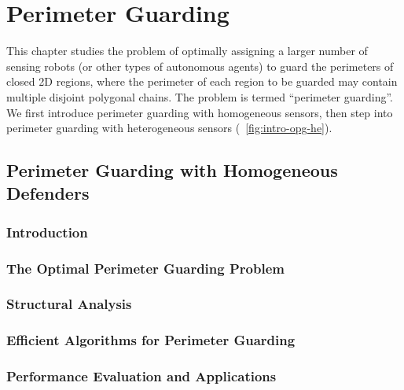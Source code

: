 
\chapter{Perimeter Guarding}
\thispagestyle{myheadings}

This chapter studies the problem of optimally assigning a larger number of sensing
robots (or other types of autonomous agents) to guard the perimeters of closed 2D regions,
where the perimeter of each region to be guarded may contain multiple disjoint polygonal chains.
The problem is termed ``perimeter guarding''.
We first introduce perimeter guarding with homogeneous sensors,
then step into perimeter guarding with heterogeneous sensors (~\ref{fig:intro-opg-he}). 

\section{Perimeter Guarding with Homogeneous Defenders}

\def\R{\mathcal R}
\def\C{\mathcal C}
\def\S{\mathcal S}
\def\P{\mathcal P}
\def\G{\mathcal G}
\def\W{\mathcal W}
\def\opg{{\sc {OPG}}\xspace}

\subsection{Introduction}


\subsection{The Optimal Perimeter Guarding Problem}\label{section:opg-problem}


\subsection{Structural Analysis}\label{section:opg-analysis}


\subsection{Efficient Algorithms for Perimeter Guarding}\label{section:opg-algorithm}


\subsection{Performance Evaluation and Applications}\label{section:opg-evaluation}


